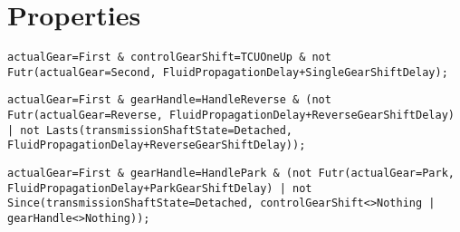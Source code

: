 \section{Properties}
\label{Section:Properties}

\begin{lstlisting}[language=TRIO,basicstyle=\small,breaklines,breakatwhitespace,frame=single,caption=Property 1,label=Code:Property1]
actualGear=First & controlGearShift=TCUOneUp & not Futr(actualGear=Second, FluidPropagationDelay+SingleGearShiftDelay);
\end{lstlisting}

\begin{lstlisting}[language=TRIO,basicstyle=\small,breaklines,breakatwhitespace,frame=single,caption=Property 2,label=Code:Property2]
actualGear=First & gearHandle=HandleReverse & (not Futr(actualGear=Reverse, FluidPropagationDelay+ReverseGearShiftDelay) | not Lasts(transmissionShaftState=Detached, FluidPropagationDelay+ReverseGearShiftDelay));
\end{lstlisting}

\begin{lstlisting}[language=TRIO,basicstyle=\small,breaklines,breakatwhitespace,frame=single,caption=Property 3,label=Code:Property3]
actualGear=First & gearHandle=HandlePark & (not Futr(actualGear=Park, FluidPropagationDelay+ParkGearShiftDelay) | not Since(transmissionShaftState=Detached, controlGearShift<>Nothing | gearHandle<>Nothing));
\end{lstlisting}
